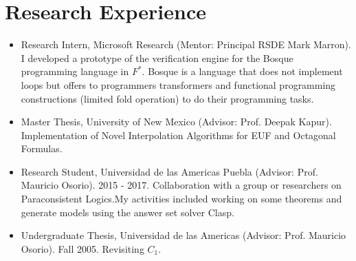 \section{Research Experience}

\begin{itemize}
\item Research Intern, Microsoft Research (Mentor: Principal RSDE Mark Marron).
  I developed a prototype of the verification engine for the Bosque programming language in $F^{*}$.
  Bosque is a language that does not implement loops but offers to programmers transformers
  and functional programming constructions (limited fold operation) to do their programming tasks.
\item Master Thesis, University of New Mexico (Advisor: Prof. Deepak Kapur).
  Implementation of Novel Interpolation Algorithms for EUF and Octagonal Formulas.
\item Research Student, Universidad de las Americas Puebla (Advisor: Prof. Mauricio
  Osorio). 2015 - 2017. Collaboration with a group or researchers on Paraconsistent
  Logics.My activities included working on some theorems and generate models using
  the answer set solver Clasp.
\item Undergraduate Thesis, Universidad de las Americas (Advisor: Prof.
  Mauricio Osorio). Fall 2005. Revisiting $C_1$.
\end{itemize}

